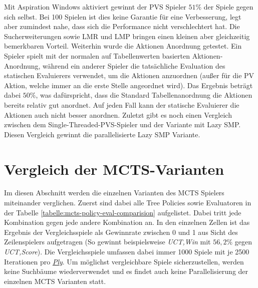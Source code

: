 Mit Aspiration Windows aktiviert gewinnt der \ac{PVS} Spieler $51\%$ der Spiele gegen sich selbst. Bei 100 Spielen ist dies keine Garantie für eine Verbesserung, legt aber zumindest nahe, dass sich die Performance nicht verschlechtert hat. Die Sucherweiterungen sowie \ac{LMR} und \ac{LMP} bringen einen kleinen aber gleichzeitig bemerkbaren Vorteil. Weiterhin wurde die Aktionen Anordnung getestet. Ein Spieler spielt mit der normalen auf Tabellenwerten basierten Aktionen-Anordnung, während ein anderer Spieler die tatsächliche Evaluation des statischen Evaluierers verwendet, um die Aktionen anzuordnen (außer für die \ac{PV} Aktion, welche immer an die erste Stelle angeordnet wird). Das Ergebnis beträgt dabei $50\%$, was dafürspricht, dass die Standard Tabellenanordnung die Aktionen bereits relativ gut anordnet. Auf jeden Fall kann der statische Evaluierer die Aktionen auch nicht besser anordnen. Zuletzt gibt es noch einen Vergleich zwischen dem Single-Threaded-\ac{PVS}-Spieler und der Variante mit Lazy \ac{SMP}. Diesen Vergleich gewinnt die parallelisierte Lazy \ac{SMP} Variante.

\section{Vergleich der MCTS-Varianten}

Im diesen Abschnitt werden die einzelnen Varianten des \ac{MCTS} Spielers miteinander verglichen. Zuerst sind dabei alle Tree Policies sowie Evaluatoren in der Tabelle \ref{tabelle:mcts-policy-eval-comparision} aufgelistet. Dabei tritt jede Kombination gegen jede andere Kombination an. In den einzelnen Zellen ist das Ergebnis der Vergleichsspiele als Gewinnrate zwischen 0 und 1 aus Sicht des Zeilenspielers aufgetragen (So gewinnt beispielsweise \emph{\acs{UCT},Win} mit $56{,}2\%$ gegen \emph{\acs{UCT},Score}). Die Vergleichsspiele umfassen dabei immer 1000 Spiele mit je 2500 Iterationen pro \hyperref[text:ply]{\emph{Ply}}. Um möglichst vergleichbare Spiele sicherzustellen, werden keine Suchbäume wiederverwendet und es findet auch keine Parallelisierung der einzelnen \ac{MCTS} Varianten statt.

